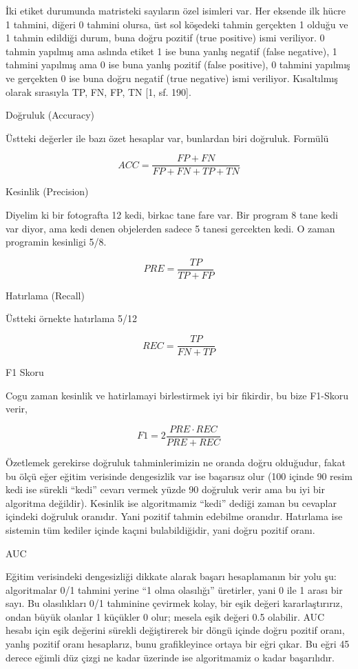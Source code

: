 \documentclass[12pt,fleqn]{article}\usepackage{../../common}
\begin{document}
İki etiket durumunda matristeki sayıların özel isimleri var. Her eksende
ilk hücre 1 tahmini, diğeri 0 tahmini olursa, üst sol köşedeki tahmin
gerçekten 1 olduğu ve 1 tahmin edildiği durum, buna doğru pozitif (true
positive) ismi veriliyor. 0 tahmin yapılmış ama aslında etiket 1 ise buna
yanlış negatif (false negative), 1 tahmini yapılmış ama 0 ise buna yanlış
pozitif (false positive), 0 tahmini yapılmış ve gerçekten 0 ise buna doğru
negatif (true negative) ismi veriliyor. Kısaltılmış olarak sırasıyla TP,
FN, FP, TN [1, sf. 190].

Doğruluk (Accuracy)

Üstteki değerler ile bazı özet hesaplar var, bunlardan biri
doğruluk. Formülü

$$ 
ACC = \frac{FP + FN}{FP + FN + TP + TN}
$$

Kesinlik (Precision)

Diyelim ki bir fotografta 12 kedi, birkac tane fare var. Bir program 8 tane
kedi var diyor, ama kedi denen objelerden sadece 5 tanesi gercekten kedi. O
zaman programin kesinligi 5/8. 

$$ 
PRE = \frac{TP}{TP + FP}
$$

Hatırlama (Recall)

Üstteki örnekte hatırlama 5/12

$$ 
REC = \frac{TP}{FN + TP}
$$

F1 Skoru

Cogu zaman kesinlik ve hatirlamayi birlestirmek iyi bir fikirdir, bu bize
F1-Skoru verir, 

$$ 
F1 = 2 \frac{PRE \cdot REC}{PRE + REC}
$$

Özetlemek gerekirse doğruluk tahminlerimizin ne oranda doğru olduğudur,
fakat bu ölçü eğer eğitim verisinde dengesizlik var ise başarısız olur (100
içinde 90 resim kedi ise sürekli ``kedi'' cevarı vermek yüzde 90 doğruluk
verir ama bu iyi bir algoritma değildir). Kesinlik ise algoritmamiz
``kedi'' dediği zaman bu cevaplar içindeki doğruluk oranıdır. Yani pozitif
tahmin edebilme oranıdır. Hatırlama ise sistemin tüm kediler içinde kaçıni
bulabildiğidir, yani doğru pozitif oranı.

AUC

Eğitim verisindeki dengesizliği dikkate alarak başarı hesaplamanın bir yolu
şu: algoritmalar 0/1 tahmini yerine ``1 olma olasılığı'' üretirler, yani 0
ile 1 arası bir sayı. Bu olasılıkları 0/1 tahminine çevirmek kolay, bir
eşik değeri kararlaştırırız, ondan büyük olanlar 1 küçükler 0 olur; mesela
eşik değeri 0.5 olabilir. AUC hesabı için eşik değerini sürekli
değiştirerek bir döngü içinde doğru pozitif oranı, yanlış pozitif oranı
hesaplarız, bunu grafikleyince ortaya bir eğri çıkar. Bu eğri 45 derece
eğimli düz çizgi ne kadar üzerinde ise algoritmamiz o kadar başarılıdır. 
\end{document}
